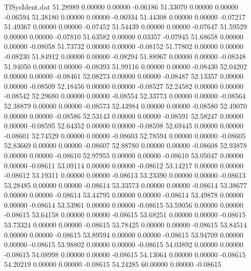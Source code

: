 \begin{filecontents}{TfSysIdent.dat}
  51.28989    0.00000    0.00000   -0.06186
  51.33070    0.00000    0.00000   -0.06594
  51.38180    0.00000    0.00000   -0.06934
  51.44308    0.00000    0.00000   -0.07217
  51.49367    0.00000    0.00000   -0.07452
  51.54439    0.00000    0.00000   -0.07647
  51.59529    0.00000    0.00000   -0.07810
  51.63582    0.00000    0.03357   -0.07945
  51.68658    0.00000    0.00000   -0.08058
  51.73732    0.00000    0.00000   -0.08152
  51.77802    0.00000    0.00000   -0.08230
  51.84912    0.00000    0.00000   -0.08294
  51.88967    0.00000    0.00000   -0.08348
  51.94050    0.00000    0.00000   -0.08393
  51.99116    0.00000    0.00000   -0.08430
  52.04202    0.00000    0.00000   -0.08461
  52.08273    0.00000    0.00000   -0.08487
  52.13357    0.00000    0.00000   -0.08509
  52.18456    0.00000    0.00000   -0.08527
  52.24582    0.00000    0.00000   -0.08542
  52.29680    0.00000    0.00000   -0.08554
  52.33773    0.00000    0.00000   -0.08564
  52.38879    0.00000    0.00000   -0.08573
  52.43984    0.00000    0.00000   -0.08580
  52.49070    0.00000    0.00000   -0.08586
  52.53143    0.00000    0.00000   -0.08591
  52.58247    0.00000    0.00000   -0.08595
  52.64352    0.00000    0.00000   -0.08598
  52.69445    0.00000    0.00000   -0.08601
  52.74529    0.00000    0.00000   -0.08603
  52.78594    0.00000    0.00000   -0.08605
  52.83669    0.00000    0.00000   -0.08607
  52.88780    0.00000    0.00000   -0.08608
  52.93878    0.00000    0.00000   -0.08610
  52.97955    0.00000    0.00000   -0.08610
  53.05047    0.00000    0.00000   -0.08611
  53.09114    0.00000    0.00000   -0.08612
  53.14217    0.00000    0.00000   -0.08612
  53.19311    0.00000    0.00000   -0.08613
  53.23390    0.00000    0.00000   -0.08613
  53.28485    0.00000    0.00000   -0.08614
  53.33573    0.00000    0.00000   -0.08614
  53.38677    0.00000    0.00000   -0.08614
  53.44795    0.00000    0.00000   -0.08614
  53.49878    0.00000    0.00000   -0.08614
  53.53961    0.00000    0.00000   -0.08615
  53.59056    0.00000    0.00000   -0.08615
  53.64158    0.00000    0.00000   -0.08615
  53.68251    0.00000    0.00000   -0.08615
  53.73324    0.00000    0.00000   -0.08615
  53.78425    0.00000    0.00000   -0.08615
  53.84514    0.00000    0.00000   -0.08615
  53.89594    0.00000    0.00000   -0.08615
  53.94709    0.00000    0.00000   -0.08615
  53.98802    0.00000    0.00000   -0.08615
  54.03892    0.00000    0.00000   -0.08615
  54.08998    0.00000    0.00000   -0.08615
  54.13064    0.00000    0.00000   -0.08615
  54.20219    0.00000    0.00000   -0.08615
  54.24285   60.00000    0.00000   -0.08615

\end{filecontents}
